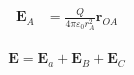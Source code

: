 
\begin{align*}
    \mathbf{E}_A &= \frac{Q}{4\pi\varepsilon_0 r_A^2}\mathbf{r}_{OA}\\
\end{align*}

$$\mathbf{E} = \mathbf{E}_a + \mathbf{E}_B + \mathbf{E}_C$$
